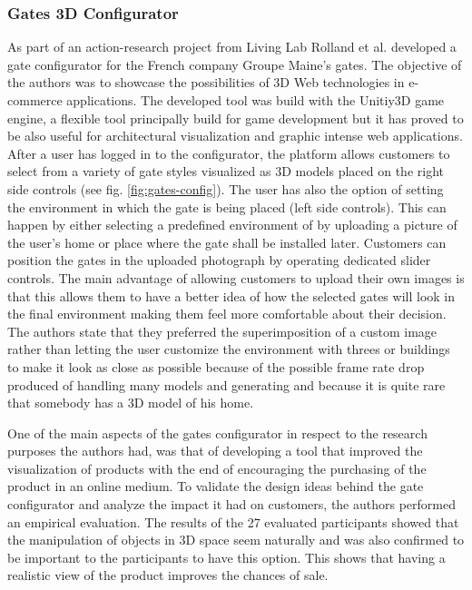 \documentclass[medieninformatik-arbeit.tex]{subfiles}
\begin{document}
\subsubsection{Gates 3D Configurator}
As part of an action-research project from Living Lab\cite{livinglabs:2015:Online} Rolland et al.\cite{rolland2012commerce} developed a gate configurator for the French company Groupe Maine's gates. The objective of the authors was to showcase the possibilities of 3D Web technologies in e-commerce applications. The developed tool was build with the Unitiy3D\cite{unity3d:2015:Online} game engine, a flexible tool principally build for game development but it has proved to be also useful for architectural visualization and graphic intense web applications. After a user has logged in to the configurator, the platform allows customers to select from a variety of gate styles visualized as 3D models placed on the right side controls (see fig. \ref{fig:gates-config}). The user has also the option of setting the environment in which the gate is being placed (left side controls). This can happen by either selecting a predefined environment of by uploading a picture of the user's home or place where the gate shall be installed later. Customers can position the gates in the uploaded photograph by operating dedicated slider controls. The main advantage of allowing customers to upload their own images is that this allows them to have a better idea of how the selected gates will look in the final environment making them feel more comfortable about their decision. The authors state that they preferred the superimposition of a custom image rather than letting the user customize the environment with threes or buildings to make it look as close as possible because of the possible frame rate drop produced of handling many models and generating and because it is quite rare that somebody has a 3D model of his home. 

One of the main aspects of the gates configurator in respect to the research purposes the authors had, was that of developing a tool that improved the visualization of products with the end of encouraging the purchasing of the product in an online medium. To validate the design ideas behind the gate configurator and analyze the impact it had on customers, the authors performed an empirical evaluation. The results of the 27 evaluated participants showed that the manipulation of objects in 3D space seem naturally and was also confirmed to be important to the participants to have this option. This shows that having a realistic view of the product improves the chances of sale. 
\end{document}
